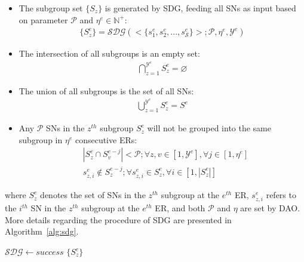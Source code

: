 \begin{itemize}
    \item The subgroup set $\{S_z\}$ is generated by SDG, feeding all SNs as input based on parameter $\mathcal{P}$ and $\eta^e \in \mathbb{N}^+$:
        \begin{align}
            \{S^e_z\} = \mathcal{SDG}(<\{s^{e}_1, s^{e}_2,...,s^{e}_\mathcal{S}\}>;\mathcal{P},\eta^e, \mathcal{Y}^e)
        \end{align}
    \item The intersection of all subgroups is an empty set:
        \begin{align}
            \bigcap_{z=1}^{\mathcal{Y}^e} S^e_z = \varnothing
        \end{align}
    \item The union of all subgroups is the set of all SNs:
        \begin{align}
            \bigcup_{z=1}^{\mathcal{Y}^e} S^e_z = S^e
        \end{align}
    \item Any $\mathcal{P}$ SNs in the $z^{th}$ subgroup $S^e_z$ will not be grouped into the same subgroup in $\eta^e$ consecutive ERs:
        \begin{align}
            &|S^e_z \cap S^{e-j}_v| < \mathcal{P}; \forall z,v \in [1,\mathcal{Y}^e], \forall j \in [1,\eta^e] \\
            &s^e_{z,i} \notin S^{e-j}_z;\forall s^{e}_{z,i} \in S^e_z, \forall i \in [1, |S^e_z|]
        \end{align}
\end{itemize}

where $S^e_z$ denotes the set of SNs in the $z^{th}$ subgroup at the $e^{th}$ ER, $s^e_{z,i}$ refers to the $i^{th}$ SN in the $z^{th}$ subgroup at the $e^{th}$ ER, and both $\mathcal{P}$ and $\eta$ are set by DAO. More details regarding the procedure of SDG are presented in Algorithm~\ref{alg:sdg}.

\begin{algorithm}[tb!]
\caption{$\mathcal{SDG}(<S^e>; \mathcal{P}, \eta^e, \mathcal{Y}^e)$}
\label{alg:sdg}
    \begin{algorithmic}[1]
                        \STATE $\mathcal{SDG} \leftarrow success$
                        \RETURN $\{S^e_z\}$
                    \ENDIF
                \ENDFOR
            \ENDFOR
        \ENDWHILE
    \end{algorithmic} 
\end{algorithm}

